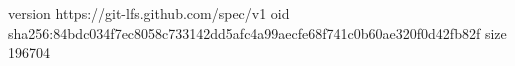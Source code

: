 version https://git-lfs.github.com/spec/v1
oid sha256:84bdc034f7ec8058c733142dd5afc4a99aecfe68f741c0b60ae320f0d42fb82f
size 196704
